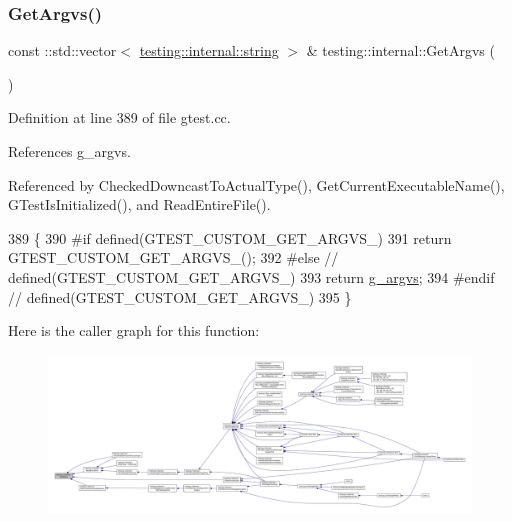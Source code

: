 \subsubsection{\texorpdfstring{Get\+Argvs()}{GetArgvs()}}
{\footnotesize\ttfamily const \+::std\+::vector$<$ \hyperlink{namespacetesting_1_1internal_a8e8ff5b11e64078831112677156cb111}{testing\+::internal\+::string} $>$ \& testing\+::internal\+::\+Get\+Argvs (\begin{DoxyParamCaption}{ }\end{DoxyParamCaption})}



Definition at line 389 of file gtest.\+cc.



References g\+\_\+argvs.



Referenced by Checked\+Downcast\+To\+Actual\+Type(), Get\+Current\+Executable\+Name(), G\+Test\+Is\+Initialized(), and Read\+Entire\+File().


\begin{DoxyCode}
389                                                    \{
390 \textcolor{preprocessor}{#if defined(GTEST\_CUSTOM\_GET\_ARGVS\_)}
391   \textcolor{keywordflow}{return} GTEST\_CUSTOM\_GET\_ARGVS\_();
392 \textcolor{preprocessor}{#else  // defined(GTEST\_CUSTOM\_GET\_ARGVS\_)}
393   \textcolor{keywordflow}{return} \hyperlink{namespacetesting_1_1internal_ab7fe90df4f87f1bd8a244b0be2ccad79}{g\_argvs};
394 \textcolor{preprocessor}{#endif  // defined(GTEST\_CUSTOM\_GET\_ARGVS\_)}
395 \}
\end{DoxyCode}
Here is the caller graph for this function\+:
\nopagebreak
\begin{figure}[H]
\begin{center}
\leavevmode
\includegraphics[width=350pt]{namespacetesting_1_1internal_a344160f771a3b754fa4e54b6e9846b23_icgraph}
\end{center}
\end{figure}
\mbox{\label{namespacetesting_1_1internal_a5fd6e5dc9eb20ab3c3a80e24d89dfac6}} 
